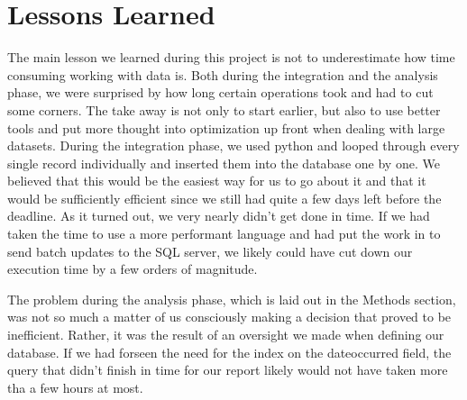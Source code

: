 \section{Lessons Learned}
The main lesson we learned during this project is not to underestimate how time consuming working with data is.
Both during the integration and the analysis phase, we were surprised by how long certain operations took and had to cut some corners.
The take away is not only to start earlier, but also to use better tools and put more thought into optimization up front when dealing with large datasets.
During the integration phase, we used python and looped through every single record individually and inserted them into the database one by one.
We believed that this would be the easiest way for us to go about it and that it would be sufficiently efficient since we still had quite a few days left before the deadline.
As it turned out, we very nearly didn't get done in time. If we had taken the time to use a more performant language and had put the work in to send batch updates to the SQL server, we likely could have cut down our execution time by a few orders of magnitude.

The problem during the analysis phase, which is laid out in the Methods section, was not so much a matter of us consciously making a decision that proved to be inefficient.
Rather, it was the result of an oversight we made when defining our database.
If we had forseen the need for the index on the dateoccurred field, the query that didn't finish in time for our report likely would not have taken more tha a few hours at most.